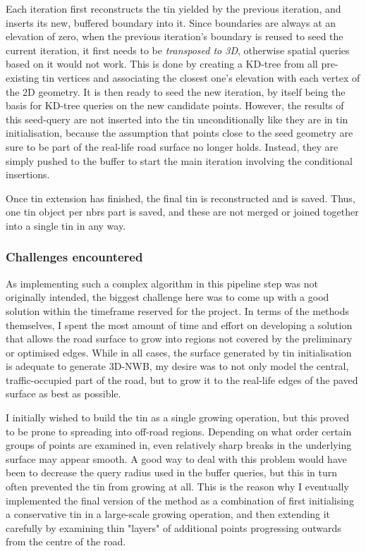 Each iteration first reconstructs the \ac{tin} yielded by the previous iteration, and inserts its new, buffered boundary into it. Since boundaries are always at an elevation of zero, when the previous iteration's boundary is reused to seed the current iteration, it first needs to be \textit{transposed to 3D}, otherwise spatial queries based on it would not work. This is done by creating a KD-tree from all pre-existing \ac{tin} vertices and associating the closest one's elevation with each vertex of the 2D geometry. It is then ready to seed the new iteration, by itself being the basis for KD-tree queries on the new candidate points. However, the results of this seed-query are not inserted into the \ac{tin} unconditionally like they are in \ac{tin} initialisation, because the assumption that points close to the seed geometry are sure to be part of the real-life road surface no longer holds. Instead, they are simply pushed to the buffer to start the main iteration involving the conditional insertions.

Once \ac{tin} extension has finished, the final \ac{tin} is reconstructed and is saved. Thus, one \ac{tin} object per \ac{nbrs} part is saved, and these are not merged or joined together into a single \ac{tin} in any way.

\subsubsection{Challenges encountered}

As implementing such a complex algorithm in this pipeline step was not originally intended, the biggest challenge here was to come up with a good solution within the timeframe reserved for the project. In terms of the methods themselves, I spent the most amount of time and effort on developing a solution that allows the road surface to grow into regions not covered by the preliminary or optimised edges. While in all cases, the surface generated by \ac{tin} initialisation is adequate to generate 3D-NWB, my desire was to not only model the central, traffic-occupied part of the road, but to grow it to the real-life edges of the paved surface as best as possible.

I initially wished to build the \ac{tin} as a single growing operation, but this proved to be prone to spreading into off-road regions. Depending on what order certain groups of points are examined in, even relatively sharp breaks in the underlying surface may appear smooth. A good way to deal with this problem would have been to decrease the query radius used in the buffer queries, but this in turn often prevented the \ac{tin} from growing at all. This is the reason why I eventually implemented the final version of the method as a combination of first initialising a conservative \ac{tin} in a large-scale growing operation, and then extending it carefully by examining thin "layers" of additional points progressing outwards from the centre of the road.

